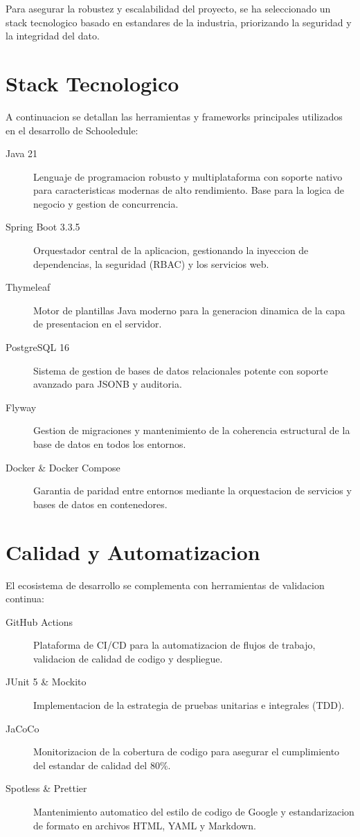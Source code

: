 Para asegurar la robustez y escalabilidad del proyecto, se ha seleccionado un stack tecnologico basado en estandares de la industria, priorizando la seguridad y la integridad del dato.

\section{Stack Tecnologico}
A continuacion se detallan las herramientas y frameworks principales utilizados en el desarrollo de Schooledule:

\begin{description}
    \item[Java 21] Lenguaje de programacion robusto y multiplataforma con soporte nativo para caracteristicas modernas de alto rendimiento. Base para la logica de negocio y gestion de concurrencia.
    \item[Spring Boot 3.3.5] Orquestador central de la aplicacion, gestionando la inyeccion de dependencias, la seguridad (RBAC) y los servicios web.
    \item[Thymeleaf] Motor de plantillas Java moderno para la generacion dinamica de la capa de presentacion en el servidor.
    \item[PostgreSQL 16] Sistema de gestion de bases de datos relacionales potente con soporte avanzado para JSONB y auditoria.
    \item[Flyway] Gestion de migraciones y mantenimiento de la coherencia estructural de la base de datos en todos los entornos.
    \item[Docker \& Docker Compose] Garantia de paridad entre entornos mediante la orquestacion de servicios y bases de datos en contenedores.
\end{description}

\section{Calidad y Automatizacion}
El ecosistema de desarrollo se complementa con herramientas de validacion continua:

\begin{description}
    \item[GitHub Actions] Plataforma de CI/CD para la automatizacion de flujos de trabajo, validacion de calidad de codigo y despliegue.
    \item[JUnit 5 \& Mockito] Implementacion de la estrategia de pruebas unitarias e integrales (TDD).
    \item[JaCoCo] Monitorizacion de la cobertura de codigo para asegurar el cumplimiento del estandar de calidad del 80\%.
    \item[Spotless \& Prettier] Mantenimiento automatico del estilo de codigo de Google y estandarizacion de formato en archivos HTML, YAML y Markdown.
\end{description}
